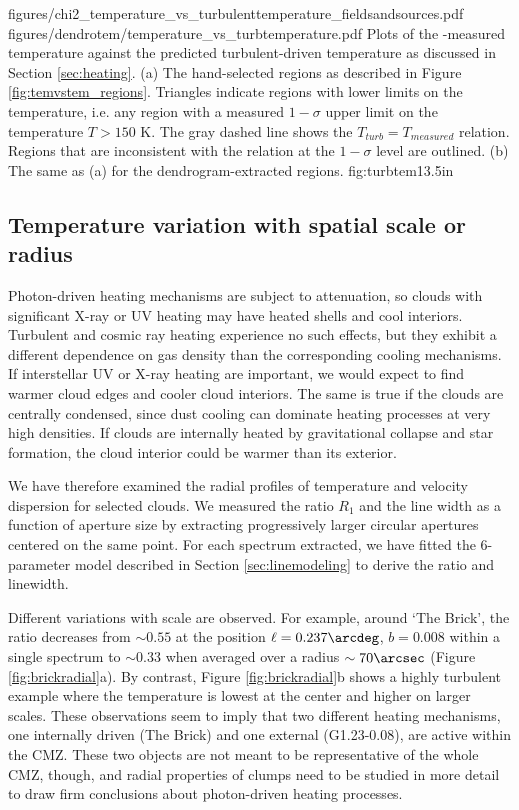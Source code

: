 \FigureTwo
{figures/chi2_temperature_vs_turbulenttemperature_fieldsandsources.pdf}
{figures/dendrotem/temperature_vs_turbtemperature.pdf}
{Plots of the \formaldehyde-measured temperature against the predicted
turbulent-driven temperature as discussed in Section \ref{sec:heating}.
(a) The hand-selected regions as described in Figure \ref{fig:temvstem_regions}.  Triangles
indicate regions with lower limits on the temperature, i.e. any region with
a measured $1-\sigma$ upper limit on the temperature $T>150$ K.  The gray
dashed line shows the $T_{turb} = T_{measured}$ relation.  Regions that are inconsistent
with the relation at the $1-\sigma$ level are outlined.
(b) The same as (a) for the dendrogram-extracted regions.  
}
{fig:turbtem}{1}{3.5in}

\subsection{Temperature variation with spatial scale or radius}
Photon-driven heating mechanisms are subject to attenuation, so clouds with
significant X-ray or UV heating may have heated shells and cool interiors.
Turbulent and cosmic ray heating experience no such effects, but they exhibit a
different dependence on gas density than the corresponding cooling mechanisms.
If interstellar UV or X-ray heating are important, we would
expect to find warmer cloud edges and cooler cloud interiors.  The same is true
if the clouds are centrally condensed, since dust cooling can dominate heating
processes at very high densities.  If clouds are internally heated by
gravitational collapse and star formation, the cloud interior could be warmer
than its exterior.  

We have therefore examined the radial profiles of temperature and velocity
dispersion for selected clouds.  We measured the ratio $R_1$ and the line width
as a function of aperture size by extracting progressively larger circular
apertures centered on the same point.  For each spectrum extracted, we have
fitted the 6-parameter model described in Section \ref{sec:linemodeling} to
derive the ratio and linewidth.

Different variations with scale are observed.  For example, around `The Brick',
the ratio decreases from $\sim0.55$ at the position $\ell=0.237\arcdeg$, $b=0.008$
within a single spectrum to $\sim0.33$ when averaged over a radius
$\sim70\arcsec$ (Figure \ref{fig:brickradial}a).  By contrast, Figure
\ref{fig:brickradial}b shows a highly turbulent example where the temperature
is lowest at the center and higher on larger scales.  
These observations seem to imply that two different heating mechanisms, one
internally driven (The Brick) and one external (G1.23-0.08), are active within
the CMZ.  These two objects are not meant to be representative of the whole
CMZ, though, and radial properties of clumps need to be studied in more detail
to draw firm conclusions about photon-driven heating processes.  

